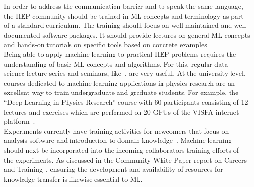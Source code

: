 In order to address the communication barrier and to speak the same language, the HEP community should be trained in ML concepts and terminology as part of a standard curriculum. The training should focus on well-maintained and well-documented software packages. It should provide lectures on general ML concepts and hands-on tutorials on specific tools based on concrete examples.\\

Being able to apply machine learning to practical HEP problems requires the understanding of basic ML concepts and algorithms. For this, regular data science lecture series and seminars, like~\cite{mlhep}, are very useful. At the university level, courses dedicated to machine learning applications in physics research are an excellent way to train undergraduate and graduate students. For example, the ``Deep Learning in Physics Research'' course with 60 participants consisting of 12 lectures and exercises which are performed on 20 GPUs of the VISPA internet platform~\cite{vispa}.\\ %

Experiments currently have training activities for newcomers that focus on analysis software and introduction to domain knowledge~\cite{2016chep.confE.334B}. Machine learning should next be incorporated into the incoming collaborators training efforts of the experiments.
As discussed in the Community White Paper report on Careers and Training~\cite{HSF-CWP-2017-02}, ensuring the development and availability of resources for knowledge transfer is likewise essential to ML.
